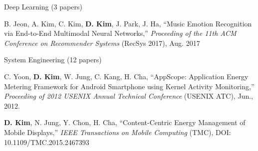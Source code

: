 

\begin{cventries}
    \cvacademicentry
        {Deep Learning (3 papers)} %
        {} %
        { %
            \begin{cvitems}
                \item {\small B. Jeon, A. Kim, C. Kim, \textbf{D. Kim}, J. Park, J. Ha, ``Music Emotion Recognition via End-to-End Multimodal Neural Networks,'' {\em Proceeding of the 11th ACM Conference on Recommender Systems} (RecSys 2017), Aug. 2017}
            \end{cvitems}
        }

    \cvacademicentry
        {System Engineering (12 papers)} %
        {} %
        { %
            \begin{cvitems}
                \item {\small C. Yoon, \textbf{D. Kim}, W. Jung, C. Kang, H. Cha, ``AppScope: Application Energy Metering Framework for Android Smartphone using Kernel Activity Monitoring,'' {\em Proceeding of 2012 USENIX Annual Technical Conference} (USENIX ATC), Jun., 2012.}
                \item {\small \textbf{D. Kim}, N. Jung, Y. Chon, H. Cha, ``Content-Centric Energy Management of Mobile Displays,'' {\em IEEE Transactions on Mobile Computing} (TMC), DOI: 10.1109/TMC.2015.2467393}
            \end{cvitems}
        }
\end{cventries}